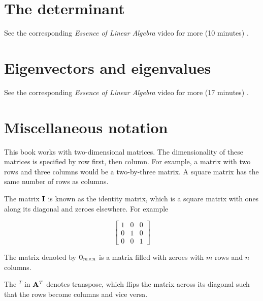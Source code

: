 \section{The determinant}

See the corresponding \textit{Essence of Linear Algebra} video for more (10
minutes) \cite{bib:linalg_the_determinant}.

\section{Eigenvectors and eigenvalues}

See the corresponding \textit{Essence of Linear Algebra} video for more (17
minutes) \cite{bib:linalg_eigenvectors_and_eigenvalues}.

\section{Miscellaneous notation}

This book works with two-dimensional matrices. The dimensionality of these
matrices is specified by row first, then column. For example, a matrix with two
rows and three columns would be a two-by-three matrix. A square matrix has the
same number of rows as columns.

The matrix $\mathbf{I}$ is known as the identity matrix, which is a square matrix
with ones along its diagonal and zeroes elsewhere. For example

\begin{equation*}
  \left[
  \begin{array}{ccc}
    1 & 0 & 0 \\
    0 & 1 & 0 \\
    0 & 0 & 1
  \end{array}
  \right]
\end{equation*}

The matrix denoted by $\mathbf{0}_{m \times n}$ is a matrix filled with zeroes with
$m$ rows and $n$ columns.

The $^T$ in $\mathbf{A}^T$ denotes transpose, which flips the matrix across its
diagonal such that the rows become columns and vice versa.
